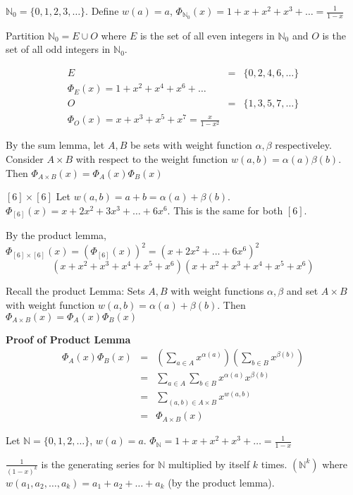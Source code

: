 \documentclass{article}
\begin{document}
\example
$\mathbb{N}_0 = \{0,1,2,3, \dots \}$. Define $w(a) = a$, $\Phi_{\mathbb{N}_0}(x) =1 + x + x^2 + x^3 + \dots = \frac{1}{1-x}$

Partition $\mathbb{N}_0 = E \cup O$ where $E$ is the set of all even integers in $\mathbb{N}_0$ and $O$ is the set of all odd integers in $\mathbb{N}_0$.

\begin{eqnarray*}
	E &=& \{0,2,4,6, \dots \} \\
	\Phi_E(x) = 1 + x^2 + x^4 + x^6 + \dots \\
	O &=&  \{ 1, 3,5,7, \dots \} \\
	\Phi_O(x) = x + x^3 + x^5 + x^7 = \frac{x}{1-x^2}	
\end{eqnarray*}

By the sum lemma, let $A,B$ be sets with weight function $\alpha, \beta$ respectiveley. Consider $A \times B$ with respect to the weight function $w(a,b) = \alpha (a) \beta (b)$. Then $\Phi_{A \times B}(x) = \Phi_A(x) \Phi_B(x)$

\example
$[6] \times [6]$ Let $w(a,b) = a+b = \alpha (a) + \beta (b)$. $\Phi_{[6]}(x) = x + 2x^2 + 3x^3 + \dots + 6x^6$. This is the same for both $[6]$.

By the product lemma, $\Phi_{[6] \times [6]}(x) = \left( \Phi_{[6]}(x) \right)^2 = (x + 2x^2 + \dots + 6x^6)^2$
$$(x+x^2+x^3+x^4+x^5+x^6)(x+x^2+x^3+x^4+x^5+x^6)$$


Recall the product Lemma: Sets $A,B$ with weight functions $\alpha, \beta$ and set $A \times B$ with weight function $w(a,b) = \alpha(a) + \beta(b)$. Then $\Phi_{A \times B} (x) = \Phi_{A}(x) \Phi_{B}(x)$

\textbf{Proof of Product Lemma}
\begin{eqnarray*}
	\Phi_A(x) \Phi_B(x) &=& \left( \sum_{a \in A} x^{\alpha (a)} \right) \left( \sum_{b \in B}x^{\beta (b)}\right) \\
	&=& \sum_{a \in A}\sum_{b \in B} x^{\alpha(a)}x^{\beta(b)}\\
	&=& \sum_{(a,b) \in A \times B} x^{w(a,b)}\\
	&=& \Phi_{A \times B}(x)
\end{eqnarray*}

\example
Let $\mathbb{N}= \{0,1,2, \dots \}$, $w(a) = a$. $\Phi_{\mathbb{N}} = 1 + x + x^2 + x^3 + \dots = \frac{1}{1-x}$

$\frac{1}{(1-x)^k}$ is the generating series for $\mathbb{N}$ multiplied by itself $k$ times. $(\mathbb{N}^k)$ where $w(a_1, a_2, \dots, a_k) = a_1 + a_2 + \dots + a_k$ (by the product lemma).
\end{document}
